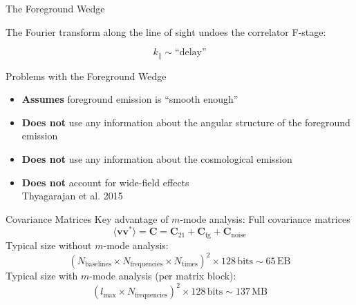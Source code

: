 \documentclass{beamer}
\renewcommand{\b}{\pmb}
\begin{document}
\begin{frame}{The Foreground Wedge}
{        The Fourier transform along the line of sight undoes the correlator F-stage:

        \[k_\parallel \sim \text{``delay''}\]
    }
\end{frame}

\begin{frame}{Problems with the Foreground Wedge}
    \begin{itemize}[label=\textbullet]
        \item \textbf{Assumes} foreground emission is ``smooth enough''
        \item \textbf{Does not} use any information about the angular structure of the
            foreground emission
        \item \textbf{Does not} use any information about the cosmological emission
        \item \textbf{Does not} account for wide-field effects\\
            {\tiny Thyagarajan et al. 2015}
    \end{itemize}
\end{frame}

\begin{frame}{Covariance Matrices}
    Key advantage of $m$-mode analysis: Full covariance matrices
    \Large
    \[
        \langle \b v \b v^* \rangle =
            \b C = \b C_{\textrm{21}} + \b C_{\textrm{fg}} + \b C_{\textrm{noise}}
    \]
    \normalsize
    Typical size without $m$-mode analysis:
    \Large
    \begin{dmath*}
        (N_{\textrm{baselines}} \times N_{\textrm{frequencies}} \times N_{\textrm{times}})^2
            \times 128\,\textrm{bits} \sim 65\,\textrm{EB}
    \end{dmath*}
    \normalsize
    Typical size with $m$-mode analysis (per matrix block):
    \Large
    \begin{dmath*}
        (l_{\textrm{max}} \times N_{\textrm{frequencies}})^2
            \times 128\,\textrm{bits} \sim 137\,\textrm{MB}
    \end{dmath*}
    \normalsize
\end{frame}
\end{document}
